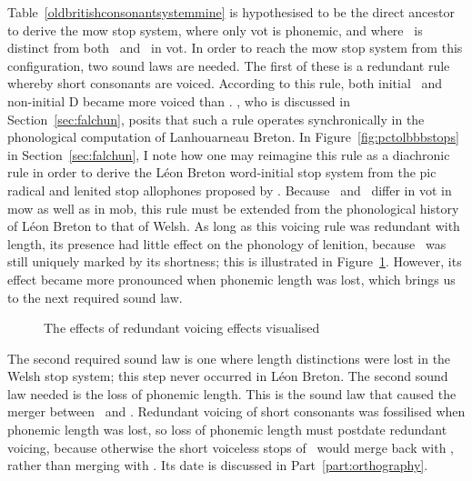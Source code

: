 Table~\ref{oldbritishconsonantsystemmine} is hypothesised to be the direct ancestor to derive the \gls{mow} stop system, where only \gls{vot} is phonemic, and where \xT\ is distinct from both \lT\ and \xD\ in \gls{vot}. In order to reach the \gls{mow} stop system from this configuration, two sound laws are needed. The first of these is a redundant rule whereby short consonants are voiced. According to this rule, both initial \lT\ and non-initial \gls{D} became more voiced than \xT. \Textcite{carlyle_syllabic_1988}, who is discussed in Section~\ref{sec:falchun}, posits that such a rule operates synchronically in the phonological computation of Lanhouarneau Breton. In Figure~\ref{fig:pctolbbbstops} in Section~\ref{sec:falchun}, I note how one may reimagine this rule as a diachronic rule in order to derive the Léon Breton word-initial stop system from the \gls{pic} radical and lenited stop allophones proposed by \textcite{harvey_aspects_1984}. Because \xT\ and \lT\ differ in \gls{vot} in \gls{mow} as well as in \gls{mob}, this rule must be extended from  the phonological history of Léon Breton to that of Welsh. As long as this voicing rule was redundant with length, its presence had little effect on the phonology of lenition, because \lT\ was still uniquely marked by its shortness; this is illustrated in Figure~\ref{fig:redvoicvis}. However, its effect became more pronounced when phonemic length was lost, which brings us to the next required sound law.

\begin{figure}[h]
  \centering
  \caption{The effects of redundant voicing effects visualised}
  \label{fig:redvoicvis}
\end{figure}

The second required sound law is one where length distinctions were lost in the Welsh stop system; this step never occurred in Léon Breton. The second sound law needed is the loss of phonemic length.  This is the sound law that caused the merger between \xD\ and \lT. Redundant voicing of short consonants was fossilised when phonemic length was lost, so loss of phonemic length must postdate redundant voicing, because otherwise the short voiceless stops of \lT\ would merge back with \xT, rather than merging with \xD. Its date is discussed in Part~\ref{part:orthography}.


